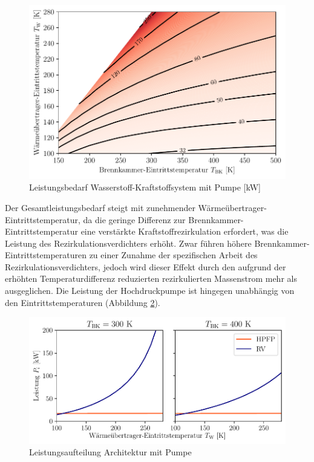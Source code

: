 \begin{figure}[ht]
\centering
\includegraphics[width=0.9\linewidth]{4_Abbildungen/2_Hauptteil/Ergebnisse/Pumpepowercontour.pdf}
  \caption{Leistungsbedarf Wasserstoff-Kraftstoffsystem mit Pumpe [kW]}
  \label{fig:pumppower}
\end{figure}
\FloatBarrier

Der Gesamtleistungsbedarf steigt mit zunehmender Wärmeübertrager-Eintrittstemperatur, da die geringe Differenz zur Brennkammer-Eintrittstemperatur eine verstärkte Kraftstoffrezirkulation erfordert, was die Leistung des Rezirkulationsverdichters erhöht. Zwar führen höhere Brennkammer-Eintrittstemperaturen zu einer Zunahme der spezifischen Arbeit des Rezirkulationsverdichters, jedoch wird dieser Effekt durch den aufgrund der erhöhten Temperaturdifferenz reduzierten rezirkulierten Massenstrom mehr als ausgeglichen. Die Leistung der Hochdruckpumpe ist hingegen unabhängig von den Eintrittstemperaturen (Abbildung \ref{fig:pumpsplit}). 

\begin{figure}[ht]
\centering
\includegraphics[width=0.9\linewidth]{4_Abbildungen/2_Hauptteil/Ergebnisse/Pumpe_powersplit.pdf}
  \caption{Leistungsaufteilung Architektur mit Pumpe}
  \label{fig:pumpsplit}
\end{figure}
\FloatBarrier

